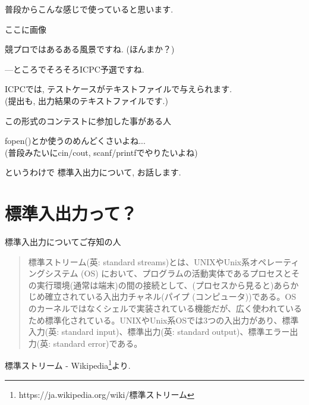 \documentclass[uplatex, dvipdfmx, unicode]{beamer}
\begin{document}
\begin{frame}
  普段からこんな感じで使っていると思います.
  
  \centering
  ここに画像
\end{frame}

\begin{frame}
  競プロではあるある風景ですね. (ほんまか？)
\end{frame}

\begin{frame}
  ---ところでそろそろICPC予選ですね.
\end{frame}

\begin{frame}
  ICPCでは, テストケースがテキストファイルで与えられます.\\
  (提出も, 出力結果のテキストファイルです.)
\end{frame}

\begin{frame}{}
  \centering
  \Huge{この形式のコンテストに参加した事がある人\faHandPaperO}
\end{frame}

\begin{frame}{}
  fopen()とか使うのめんどくさいよね... \\
  (普段みたいにcin/cout, scanf/printfでやりたいよね)
\end{frame}

\begin{frame}{というわけで}
  標準入出力について, お話します.
\end{frame}

\section{標準入出力って？}
\begin{frame}
  \centering
  \Huge{標準入出力についてご存知の人\faHandPaperO}
\end{frame}

\begin{frame}
  \begin{quote}
    標準ストリーム(英: standard streams)とは、UNIXやUnix系オペレーティングシステム (OS) において、プログラムの活動実体であるプロセスとその実行環境(通常は端末)の間の接続として、(プロセスから見ると)あらかじめ確立されている入出力チャネル(パイプ (コンピュータ))である。OSのカーネルではなくシェルで実装されている機能だが、広く使われているため標準化されている。UNIXやUnix系OSでは3つの入出力があり、標準入力(英: standard input)、標準出力(英: standard output)、標準エラー出力(英: standard error)である。
  \end{quote}
  \small{標準ストリーム - Wikipedia\footnote{https://ja.wikipedia.org/wiki/標準ストリーム}より.}
\end{frame}
\end{document}
